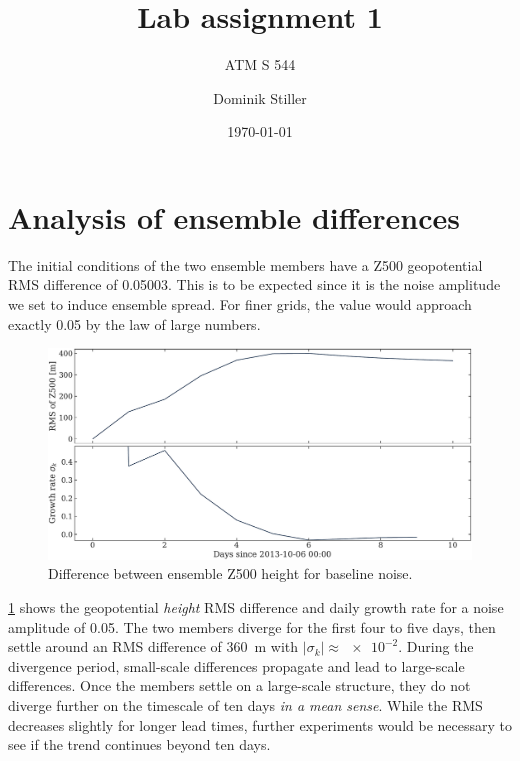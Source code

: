 \documentclass[parskip=half,DIV=12,bookmarkpackage=false]{scrartcl}
\title{Lab assignment 1}
\subtitle{ATM S 544}
\author{Dominik Stiller}
\date{\today}
\begin{document}
\maketitle

\vfill

\section{Analysis of ensemble differences}

The initial conditions of the two ensemble members have a Z500 geopotential RMS difference of 0.05003. This is to be expected since it is the noise amplitude we set to induce ensemble spread. For finer grids, the value would approach exactly 0.05 by the law of large numbers.

\begin{figure}[h]
    \centering
    \includegraphics[width=\textwidth]{figures/factor1.pdf}
    \caption{Difference between ensemble Z500 height for baseline noise.}
    \label{fig:fac-1}
\end{figure}

\cref{fig:fac-1} shows the geopotential \emph{height} RMS difference and daily growth rate for a noise amplitude of 0.05. The two members diverge for the first four to five days, then settle around an RMS difference of \qty{360}{m} with $|\sigma_k| \approx \num{e-2}$. During the divergence period, small-scale differences propagate and lead to large-scale differences. Once the members settle on a large-scale structure, they do not diverge further on the timescale of ten days \emph{in a mean sense}. While the RMS decreases slightly for longer lead times, further experiments would be necessary to see if the trend continues beyond ten days.
\end{document}
